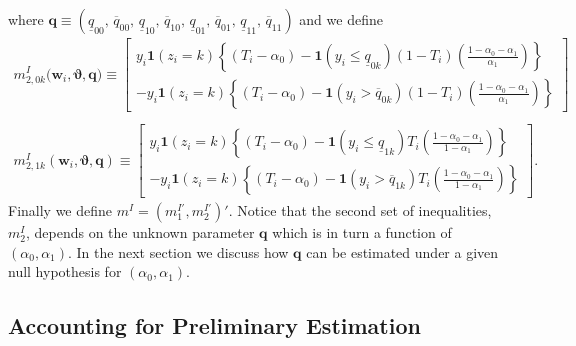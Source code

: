 where $\mathbf{q} \equiv ( \underline{q}_{00},\, \overline{q}_{00},\, \underline{q}_{10}, \,\overline{q}_{10},\, \underline{q}_{01}, \,\overline{q}_{01},\, \underline{q}_{11},\, \overline{q}_{11})$ and we define
\begin{align}
  m_{2,0k}^I\big(\mathbf{w}_i, \boldsymbol{\vartheta}, \mathbf{q}) \equiv \left[
  \begin{array}{r}
    y_i \mathbf{1}\left( z_i=k \right)\left\{(T_i - \alpha_0) - \mathbf{1}(y_i \leq \underline{q}_{0k})  (1 - T_i)\left( \frac{1 - \alpha_0 - \alpha_1}{\alpha_1} \right)\right\} \\
    - y_i \mathbf{1}(z_i=k) \left\{ (T_i - \alpha_0) -  \mathbf{1}(y_i > \overline{q}_{0k}) (1 - T_i) \left( \frac{1 - \alpha_0 - \alpha_1}{\alpha_1} \right) \right\} 
\end{array}
\right] \label{eq:m2I_0k} \\\nonumber \\
  m_{2,1k}^I(\mathbf{w}_i, \boldsymbol{\vartheta}, \mathbf{q}) \equiv \left[
  \begin{array}{r}
    y_i \mathbf{1}\left( z_i=k \right)\left\{(T_i - \alpha_0) - \mathbf{1}(y_i \leq \underline{q}_{1k})  T_i\left( \frac{1 - \alpha_0 - \alpha_1}{1 - \alpha_1} \right)\right\} \\
    - y_i \mathbf{1}(z_i=k) \left\{ (T_i - \alpha_0) -  \mathbf{1}(y_i > \overline{q}_{1k}) T_i \left( \frac{1 - \alpha_0 - \alpha_1}{1 - \alpha_1} \right) \right\} \label{eq:m2I_1k}
\end{array}
\right].
\end{align}
Finally we define $m^I = (m_1^{I'}, m_2^{I'})'$.
Notice that the second set of inequalities, $m_2^I$, depends on the unknown parameter $\mathbf{q}$ which is in turn a function of $(\alpha_0, \alpha_1)$.
In the next section we discuss how $\mathbf{q}$ can be estimated under a given null hypothesis for $(\alpha_0, \alpha_1)$. 


\subsection{Accounting for Preliminary Estimation}
\label{sec:prelim}


